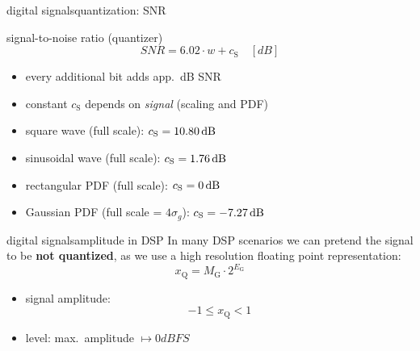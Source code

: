             \begin{frame}{digital signals}{quantization: SNR}
                \vspace{-10mm}
                \toremember{}
                \begin{block}{signal-to-noise ratio (quantizer)}
                    \centering
                    \begin{equation*}
                        SNR = 6.02\cdot w + c_{\mathrm{S}}\quad [dB]
                    \end{equation*}
                    \vspace{-5mm}
                    \begin{itemize}
                        \item	every additional bit adds app.\ \unit[6]{dB} SNR
                        \item	constant $c_{\mathrm{S}}$ depends on \textit{signal} (scaling and PDF)
                    \end{itemize}
                \end{block}
                \pause
                \begin{itemize}
                    \item	square wave (full scale): $c_{\mathrm{S}} =  \unit[10.80]{dB}$
                    \item	sinusoidal wave (full scale): $c_{\mathrm{S}} =  \unit[1.76]{dB}$
                    \item	rectangular {PDF} (full scale): $c_{\mathrm{S}} =  \unit[0]{dB}$
                    \item	Gaussian {PDF} (full scale = $4\sigma_{g}$): $c_{\mathrm{S}} =  \unit[-7.27]{dB}$
                \end{itemize}
            \end{frame}		
               
            \begin{frame}{digital signals}{amplitude in DSP}
                In many DSP scenarios we can pretend the signal to be \textbf{not quantized}, as we use a high resolution floating point representation: 
                \begin{equation*}
                    x_{\mathrm{Q}} = M_{\mathrm{G}}\cdot 2^{E_{\mathrm{G}}}
                \end{equation*}
                \begin{itemize}
                    \item<2->	signal amplitude:
                        \begin{equation*}
                            -1 \leq x_{\mathrm{Q}} < 1
                        \end{equation*}
                    \item<3->	level: max.\ amplitude $\mapsto \unit{0}{dBFS}$
                \end{itemize}
            \end{frame}
            
